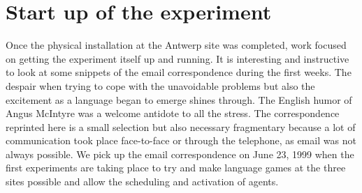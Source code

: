 \section{Start up of the experiment} 

Once the physical installation at the Antwerp site was completed, work focused on getting the experiment itself 
up and running. It is interesting and instructive to look at some snippets of the email correspondence during the 
first weeks. The despair when trying to cope with the unavoidable problems but also the excitement 
as a language began to emerge shines through. The English humor of Angus McIntyre was a welcome antidote to 
all the stress. The correspondence reprinted here is a small selection but also necessary fragmentary because a 
lot of communication took place face-to-face or through the telephone, as email was not always possible. 
\clearpage
We pick up the email correspondence on
June 23, 1999 when the first experiments are taking place to try and make language games at the three sites possible 
and allow the scheduling and activation of agents. 

